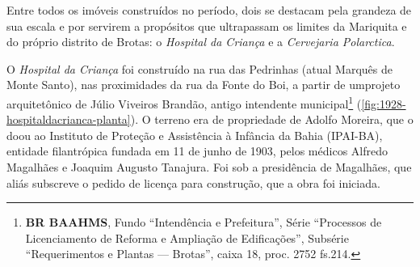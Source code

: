 Entre todos os imóveis construídos no período, dois se destacam pela grandeza de sua escala e por servirem a propósitos que ultrapassam os limites da Mariquita e do próprio distrito de Brotas: o \textit{Hospital da Criança} e a \textit{Cervejaria Polarctica}.

O \textit{Hospital da Criança} foi construído na rua das Pedrinhas (atual Marquês de Monte Santo), nas proximidades da rua da Fonte do Boi, a partir de umprojeto arquitetônico de Júlio Viveiros Brandão, antigo intendente municipal\footnote{\textbf{BR BAAHMS}, Fundo ``Intendência e Prefeitura'', Série ``Processos de Licenciamento de Reforma e Ampliação de Edificações'', Subsérie ``Requerimentos e Plantas --- Brotas'', caixa 18, proc. 2752 fs.214.} (\autoref{fig:1928-hospitaldacrianca-planta}). O terreno era de propriedade de Adolfo Moreira, que o doou ao Instituto de Proteção e Assistência à Infância da Bahia (IPAI-BA), entidade filantrópica fundada em 11 de junho de 1903, pelos médicos Alfredo Magalhães e Joaquim Augusto Tanajura. Foi sob a presidência de Magalhães, que aliás subscreve o pedido de licença para construção, que a obra foi iniciada. 


